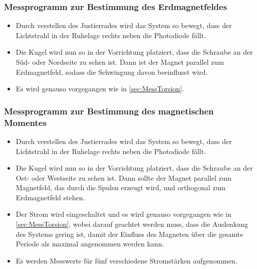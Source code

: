 \subsubsection{Messprogramm zur Bestimmung des Erdmagnetfeldes}

\begin{itemize}

  \item Durch verstellen des Justierrades wird das System so bewegt,
  dass der Lichtstrahl in der Ruhelage rechts neben die Photodiode fällt.

  \item Die Kugel wird nun so in der Vorrichtung platziert, dass die Schraube
  an der Süd- oder Nordseite zu sehen ist. Dann ist der Magnet parallel zum
  Erdmagnetfeld, sodass die Schwingung davon beeinflusst wird.

  \item Es wird genauso vorgegangen wie in \ref{sec:MessTorsion}.

\end{itemize}

\subsubsection{Messprogramm zur Bestimmung des magnetischen Momentes}

\begin{itemize}

  \item Durch verstellen des Justierrades wird das System so bewegt,
  dass der Lichtstrahl in der Ruhelage rechts neben die Photodiode fällt.

  \item Die Kugel wird nun so in der Vorrichtung platziert, dass die Schraube
  an der Ost- oder Westseite zu sehen ist. Dann sollte der Magnet parallel
  zum Magnetfeld, das durch die Spulen erzeugt wird, und orthogonal zum
  Erdmagnetfeld stehen.

  \item Der Strom wird eingeschaltet und es wird genauso vorgegangen wie in
  \ref{sec:MessTorsion}, wobei darauf geachtet werden muss, dass die Auslenkung
  des Systems gering ist, damit der Einfluss des Magneten über die gesamte
  Periode als maximal angenommen werden kann.

  \item Es werden Messwerte für fünf verschiedene Stromstärken aufgenommen.

\end{itemize}

